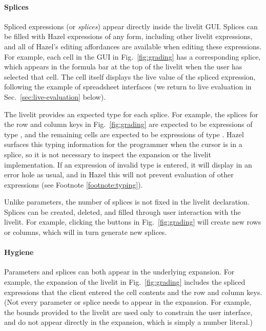 \paragraph{Splices}\label{sec:splices}
Spliced expressions (or \emph{splices}) appear directly inside the livelit GUI.
Splices can be filled with Hazel expressions of any form, including other livelit expressions, 
and all of Hazel's editing affordances are available when editing these expressions.
For example, each cell in the  GUI in Fig.~\ref{fig:grading} 
has a corresponding splice, which appears in the formula bar at the top of the livelit 
when the user has selected that cell. 
The cell itself displays the live value of the spliced expression, 
following the example of spreadsheet interfaces 
(we return to live evaluation in Sec.~\ref{sec:live-evaluation} below).

The livelit provides an expected type for each splice.
For example, the splices for the row and column keys in Fig.~\ref{fig:grading} are expected to be expressions
of type , and the remaining cells are expected to be expressions of type . 
Hazel surfaces this typing information for the programmer when the cursor is in a splice, 
so it is not necessary to inspect the expansion or the livelit implementation.
If an expression of invalid type is entered, it will display in an error hole as usual,
and in Hazel this will not prevent evaluation of other expressions (see Footnote \ref{footnote:typing}).

Unlike parameters, the number of splices is not fixed in the livelit declaration. Splices can be created, 
deleted, and filled through user interaction with the livelit. For example, clicking the \li{+} buttons
in Fig.~\ref{fig:grading} will create new rows or columns, which will in turn generate new splices.

\paragraph{Hygiene}\label{sec:hygiene}
Parameters and splices can both appear in the underlying expansion. For example,
the expansion of the  livelit in Fig.~\ref{fig:grading} includes the 
spliced expressions that the client entered the cell contents and the row and column keys.
(Not every parameter or splice needs to appear in the expansion. For example,
the bounds provided to the  livelit are used only to constrain the user 
interface, and do not appear directly in the expansion, which is simply a number literal.)

